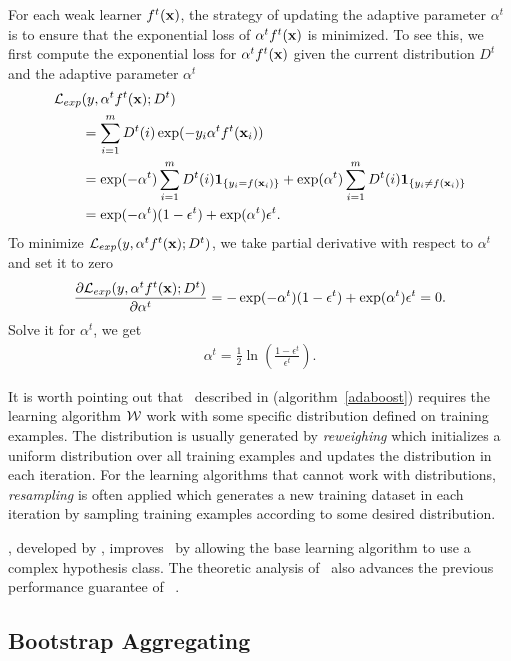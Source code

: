 {For each weak learner $f^t(\mathbf {x})$, the strategy of updating the adaptive parameter $\alpha^t$ is to ensure that the exponential loss of $\alpha^tf^t(\mathbf {x})$ is minimized.
To see this, we first compute the exponential loss for $\alpha^tf^t(\mathbf {x})$ given the current distribution $D^t$ and the adaptive parameter $\alpha^t$
\begin{align*}
	\mathcal{L}_{exp}&(y,\alpha^tf^t(\mathbf {x});D^t) \\
	&= \sum_{i=1}^mD^t(i)\exp(-y_i\alpha^tf^t(\mathbf {x}_i))\\
	&=\exp(-\alpha^t)\sum_{i=1}^mD^t(i)\mathbf{1}_{\{y_i=f(\mathbf {x}_i)\}} + \exp(\alpha^t)\sum_{i=1}^mD^t(i)\mathbf{1}_{\{y_i\neq f(\mathbf {x}_i)\}}\\
	&=\exp(-\alpha^t)(1-\epsilon^t) + \exp(\alpha^t)\epsilon^t.
\end{align*}
To minimize $\mathcal{L}_{exp}(y,\alpha^tf^t(\mathbf {x});D^t)$, we take partial derivative with respect to $\alpha^t$ and set it to zero
\begin{align*}
	\frac{\partial\mathcal{L}_{exp}(y,\alpha^tf^t(\mathbf {x});D^t)}{\partial\alpha^t} = -\exp(-\alpha^t)(1-\epsilon^t) + \exp(\alpha^t)\epsilon^t=0.
\end{align*}
Solve it for $\alpha^t$, we get
\begin{align*}
	\alpha^{t} = \frac{1}{2}\ln\left(\frac{1-\epsilon^t}{\epsilon^t}\right).
\end{align*}

It is worth pointing out that \adaboost\ described in (algorithm~\ref{adaboost}) requires the learning algorithm $\mathcal{W}$ work with some specific distribution defined on training examples.
The distribution is usually generated by \textit{reweighing} which initializes a uniform distribution over all training examples and updates the distribution in each iteration.
For the learning algorithms that cannot work with distributions, \textit{resampling} is often applied which generates a new training dataset in each iteration by sampling training examples according to some desired distribution. 

\deepboosting, developed by \citet{Cortes14deep}, improves \adaboost\ by allowing the base learning algorithm to use a complex hypothesis class.
The theoretic analysis of \deepboosting\ also advances the previous performance guarantee of \adaboost\ \citep{Schapire97boosting,Koltchinskii00empirical}.




\subsection{Bootstrap Aggregating} \label{sc_ba}

}
